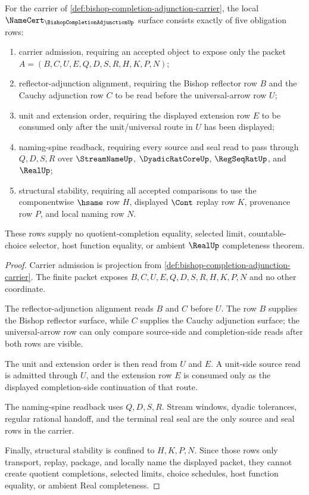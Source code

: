 \begin{theorem}
\label{thm:bishop-completion-adjunction-namecert-obligations}
For the carrier of \autoref{def:bishop-completion-adjunction-carrier}, the local $\NameCert_{\BishopCompletionAdjunctionUp}$ surface consists exactly of five obligation rows:
\begin{enumerate}
\item carrier admission, requiring an accepted object to expose only the packet $A=(B,C,U,E,Q,D,S,R,H,K,P,N)$;
\item reflector-adjunction alignment, requiring the Bishop reflector row $B$ and the Cauchy adjunction row $C$ to be read before the universal-arrow row $U$;
\item unit and extension order, requiring the displayed extension row $E$ to be consumed only after the unit/universal route in $U$ has been displayed;
\item naming-spine readback, requiring every source and seal read to pass through $Q,D,S,R$ over $\StreamNameUp$, $\DyadicRatCoreUp$, $\RegSeqRatUp$, and $\RealUp$;
\item structural stability, requiring all accepted comparisons to use the componentwise $\hsame$ row $H$, displayed $\Cont$ replay row $K$, provenance row $P$, and local naming row $N$.
\end{enumerate}
These rows supply no quotient-completion equality, selected limit, countable-choice selector, host function equality, or ambient $\RealUp$ completeness theorem.
\end{theorem}
\begin{proof}
Carrier admission is projection from \autoref{def:bishop-completion-adjunction-carrier}. The finite packet exposes $B,C,U,E,Q,D,S,R,H,K,P,N$ and no other coordinate.

The reflector-adjunction alignment reads $B$ and $C$ before $U$. The row $B$ supplies the Bishop reflector surface, while $C$ supplies the Cauchy adjunction surface; the universal-arrow row can only compare source-side and completion-side reads after both rows are visible.

The unit and extension order is then read from $U$ and $E$. A unit-side source read is admitted through $U$, and the extension row $E$ is consumed only as the displayed completion-side continuation of that route.

The naming-spine readback uses $Q,D,S,R$. Stream windows, dyadic tolerances, regular rational handoff, and the terminal real seal are the only source and seal rows in the carrier.

Finally, structural stability is confined to $H,K,P,N$. Since those rows only transport, replay, package, and locally name the displayed packet, they cannot create quotient completions, selected limits, choice schedules, host function equality, or ambient Real completeness.
\end{proof}

